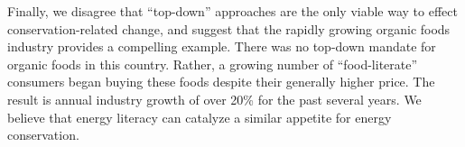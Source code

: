 \documentclass[11pt]{article}
\begin{document}
Finally, we disagree that ``top-down'' approaches are the only viable way
to effect conservation-related change, and suggest that the rapidly growing
organic foods industry provides a compelling example.  There was no
top-down mandate for organic foods in this country. Rather, a growing
number of ``food-literate'' consumers began buying these foods despite
their generally higher price.  The result is annual industry growth of over
20\% for the past several years.  We believe that energy literacy can
catalyze a similar appetite for energy conservation.




\end{document}

